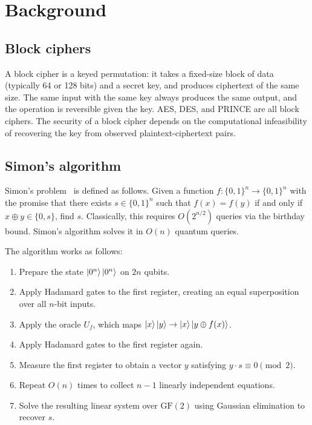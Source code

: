 \documentclass[11pt]{article}
\begin{document}
\section{Background}

\subsection{Block ciphers}

A block cipher is a keyed permutation: it takes a fixed-size block of data (typically 64 or 128 bits) and a secret key, and produces ciphertext of the same size. The same input with the same key always produces the same output, and the operation is reversible given the key. AES, DES, and PRINCE are all block ciphers. The security of a block cipher depends on the computational infeasibility of recovering the key from observed plaintext-ciphertext pairs.

\subsection{Simon's algorithm}

Simon's problem~\cite{simon1997} is defined as follows. Given a function $f: \{0,1\}^n \to \{0,1\}^n$ with the promise that there exists $s \in \{0,1\}^n$ such that $f(x) = f(y)$ if and only if $x \oplus y \in \{0, s\}$, find $s$. Classically, this requires $O(2^{n/2})$ queries via the birthday bound. Simon's algorithm solves it in $O(n)$ quantum queries.

The algorithm works as follows:

\begin{enumerate}
    \item Prepare the state $\ket{0^n}\ket{0^n}$ on $2n$ qubits.
    \item Apply Hadamard gates to the first register, creating an equal superposition over all $n$-bit inputs.
    \item Apply the oracle $U_f$, which maps $\ket{x}\ket{y} \to \ket{x}\ket{y \oplus f(x)}$.
    \item Apply Hadamard gates to the first register again.
    \item Measure the first register to obtain a vector $y$ satisfying $y \cdot s \equiv 0 \pmod{2}$.
    \item Repeat $O(n)$ times to collect $n-1$ linearly independent equations.
    \item Solve the resulting linear system over $\text{GF}(2)$ using Gaussian elimination to recover $s$.
\end{enumerate}
\end{document}
